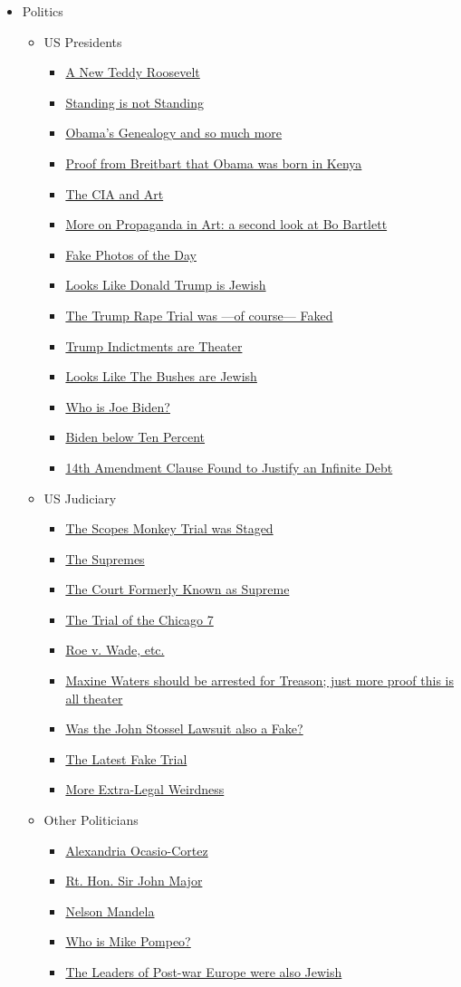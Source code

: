 \documentclass{article}
\newcommand{\insertmydocument}[2]{ %
  \item \href{http://www.mileswmathis.com/#2}{#1}
}
\begin{document}
\begin{itemize}
  \item Politics
  \begin{itemize}

    \item US Presidents
    \begin{itemize}

      \insertmydocument{A New Teddy Roosevelt}{TRox.pdf}
      \insertmydocument{Standing is not Standing}{stand.pdf}
      \insertmydocument{Obama's Genealogy and so much more}{dunham.pdf}
      \insertmydocument{Proof from Breitbart that Obama was born in Kenya}{breit.pdf}
      \insertmydocument{The CIA and Art}{obey.pdf}
      \insertmydocument{More on Propaganda in Art: a second look at Bo Bartlett}{bo2.pdf}
      \insertmydocument{Fake Photos of the Day}{tafari.pdf}
      \insertmydocument{Looks Like Donald Trump is Jewish}{trump.pdf}
      \insertmydocument{The Trump Rape Trial was —of course— Faked}{ejean.pdf}
      \insertmydocument{Trump Indictments are Theater}{chut.pdf}
      \insertmydocument{Looks Like The Bushes are Jewish}{bush.pdf}
      \insertmydocument{Who is Joe Biden?}{biden.pdf}
      \insertmydocument{Biden below Ten Percent}{biden2.pdf}
      \insertmydocument{14th Amendment Clause Found to Justify an Infinite Debt}{poll3.pdf}
    \end{itemize}

    \item US Judiciary
    \begin{itemize}

      \insertmydocument{The Scopes Monkey Trial was Staged}{monkey.pdf}
      \insertmydocument{The Supremes}{supreme.pdf}
      \insertmydocument{The Court Formerly Known as Supreme}{sup2.pdf}
      \insertmydocument{The Trial of the Chicago 7}{sacha.pdf}
      \insertmydocument{Roe v. Wade, etc.}{roe.pdf}
      \insertmydocument{Maxine Waters should be arrested for Treason; just more proof this is all theater}{maxine.pdf}
      \insertmydocument{Was the John Stossel Lawsuit also a Fake?}{slappback.pdf}
      \insertmydocument{The Latest Fake Trial}{domin.pdf}
      \insertmydocument{More Extra-Legal Weirdness}{oops.pdf}

    \end{itemize}

    \item Other Politicians
    \begin{itemize}

      \insertmydocument{Alexandria Ocasio-Cortez}{aoc.pdf}
      \insertmydocument{Rt. Hon. Sir John Major}{ball.pdf}
      \insertmydocument{Nelson Mandela}{mandela4.pdf}
      \insertmydocument{Who is Mike Pompeo?}{pompeo.pdf}
      \insertmydocument{The Leaders of Post-war Europe were also Jewish}{aden.pdf}


\end{itemize}
\end{itemize}
\end{itemize}
\end{document}
